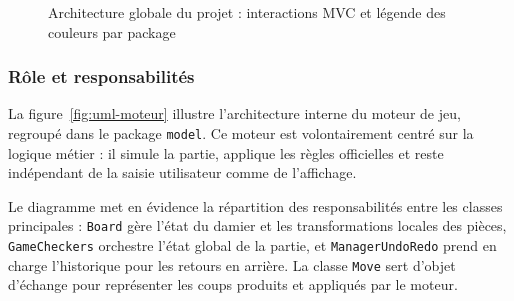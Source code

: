 \documentclass[a4paper]{article}
\begin{document}
\begin{figure}[ht]
{
}
\caption{Architecture globale du projet : interactions MVC et légende des couleurs par package}
\label{fig:architecture-globale-projet}
\end{figure}

\subsubsection{Rôle et responsabilités}

La figure~\ref{fig:uml-moteur} illustre l'architecture interne du moteur de jeu, regroupé dans le package \texttt{model}. Ce moteur est volontairement centré sur la logique métier : il simule la partie, applique les règles officielles et reste indépendant de la saisie utilisateur comme de l'affichage.

Le diagramme met en évidence la répartition des responsabilités entre les classes principales : \texttt{Board} gère l'état du damier et les transformations locales des pièces, \texttt{GameCheckers} orchestre l'état global de la partie, et \texttt{ManagerUndoRedo} prend en charge l'historique pour les retours en arrière. La classe \texttt{Move} sert d'objet d'échange pour représenter les coups produits et appliqués par le moteur.
\end{document}
